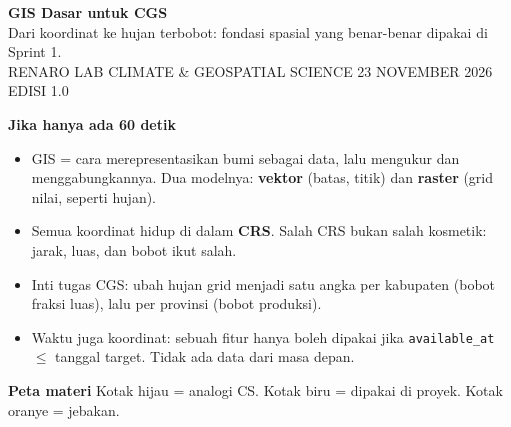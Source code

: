 \documentclass[9pt,a4paper]{extarticle}
\newcommand{\code}[1]{\texttt{\small\color{ink}#1}}
\begin{document}
\thispagestyle{empty}

\begin{tcolorbox}[enhanced,colback=ink,colframe=ink,boxrule=0pt,arc=2mm,
  left=5mm,right=5mm,top=4.2mm,bottom=4.2mm]
{\color{white}\sffamily\bfseries\fontsize{23}{25}\selectfont GIS Dasar untuk CGS}\\[2pt]
{\color{white!82!ink}\sffamily\fontsize{10.8}{13}\selectfont
Dari koordinat ke hujan terbobot: fondasi spasial yang benar-benar dipakai di Sprint 1.}\\[6pt]
{\color{accent!55!white}\sffamily\footnotesize
RENARO LAB \textperiodcentered{} CLIMATE \& GEOSPATIAL SCIENCE \textperiodcentered{} 23 NOVEMBER 2026 \textperiodcentered{} EDISI 1.0}
\end{tcolorbox}

\vspace{-1pt}
\begin{tcolorbox}[enhanced,colback=tealbg,colframe=tealbg,boxrule=0pt,arc=1mm,
  left=3.2mm,right=3mm,top=2mm,bottom=2mm]
{\sffamily\bfseries\color{deepgreen}Jika hanya ada 60 detik}\\[1pt]
\begin{itemize}[leftmargin=1.1em,itemsep=0.5pt,topsep=1pt,parsep=0pt]
  \item GIS = cara merepresentasikan bumi sebagai data, lalu mengukur dan menggabungkannya. Dua modelnya: \textbf{vektor} (batas, titik) dan \textbf{raster} (grid nilai, seperti hujan).
  \item Semua koordinat hidup di dalam \textbf{CRS}. Salah CRS bukan salah kosmetik: jarak, luas, dan bobot ikut salah.
  \item Inti tugas CGS: ubah hujan grid menjadi satu angka per kabupaten (bobot fraksi luas), lalu per provinsi (bobot produksi).
  \item Waktu juga koordinat: sebuah fitur hanya boleh dipakai jika \code{available\_at} $\le$ tanggal target. Tidak ada data dari masa depan.
\end{itemize}
\end{tcolorbox}

\vspace{1pt}
{\sffamily\bfseries\color{ink}Peta materi}\quad
{\footnotesize\color{muted}Kotak hijau = analogi CS. Kotak biru = dipakai di proyek. Kotak oranye = jebakan.}
\end{document}
